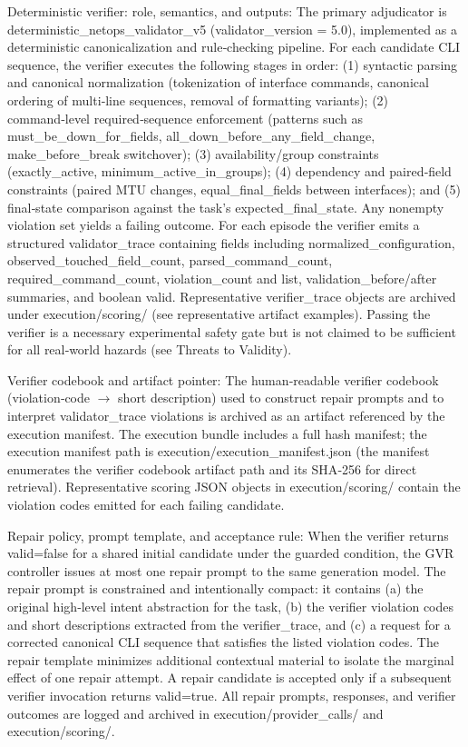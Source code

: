 \documentclass[conference]{IEEEtran}
\begin{document}
Deterministic verifier: role, semantics, and outputs: The primary adjudicator is deterministic\_netops\_validator\_v5 (validator\_version = 5.0), implemented as a deterministic canonicalization and rule‑checking pipeline. For each candidate CLI sequence, the verifier executes the following stages in order: (1) syntactic parsing and canonical normalization (tokenization of interface commands, canonical ordering of multi‑line sequences, removal of formatting variants); (2) command‑level required‑sequence enforcement (patterns such as must\_be\_down\_for\_fields, all\_down\_before\_any\_field\_change, make\_before\_break switchover); (3) availability/group constraints (exactly\_active, minimum\_active\_in\_groups); (4) dependency and paired‑field constraints (paired MTU changes, equal\_final\_fields between interfaces); and (5) final‑state comparison against the task's expected\_final\_state. Any nonempty violation set yields a failing outcome. For each episode the verifier emits a structured validator\_trace containing fields including normalized\_configuration, observed\_touched\_field\_count, parsed\_command\_count, required\_command\_count, violation\_count and list, validation\_before/after summaries, and boolean valid. Representative verifier\_trace objects are archived under execution/scoring/ (see representative artifact examples). Passing the verifier is a necessary experimental safety gate but is not claimed to be sufficient for all real‑world hazards (see Threats to Validity).

Verifier codebook and artifact pointer: The human‑readable verifier codebook (violation‑code \ensuremath{\rightarrow} short description) used to construct repair prompts and to interpret validator\_trace violations is archived as an artifact referenced by the execution manifest. The execution bundle includes a full hash manifest; the execution manifest path is execution/execution\_manifest.json (the manifest enumerates the verifier codebook artifact path and its SHA‑256 for direct retrieval). Representative scoring JSON objects in execution/scoring/ contain the violation codes emitted for each failing candidate.

Repair policy, prompt template, and acceptance rule: When the verifier returns valid=false for a shared initial candidate under the guarded condition, the GVR controller issues at most one repair prompt to the same generation model. The repair prompt is constrained and intentionally compact: it contains (a) the original high‑level intent abstraction for the task, (b) the verifier violation codes and short descriptions extracted from the verifier\_trace, and (c) a request for a corrected canonical CLI sequence that satisfies the listed violation codes. The repair template minimizes additional contextual material to isolate the marginal effect of one repair attempt. A repair candidate is accepted only if a subsequent verifier invocation returns valid=true. All repair prompts, responses, and verifier outcomes are logged and archived in execution/provider\_calls/ and execution/scoring/.
\end{document}
